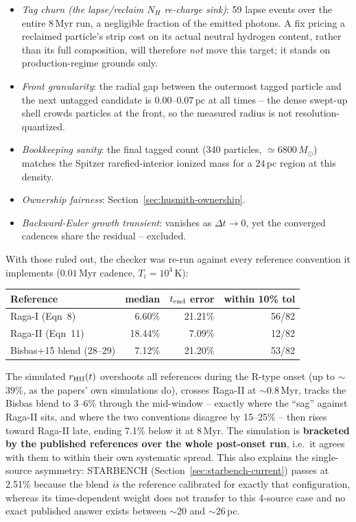 \begin{itemize}
\item \emph{Tag churn (the lapse/reclaim $N_H$ re-charge sink)}: 59
  lapse events over the entire $8\,$Myr run, a negligible fraction of
  the emitted photons. A fix pricing a reclaimed particle's strip cost
  on its actual neutral hydrogen content, rather than its full
  composition, will therefore \emph{not} move this target; it stands on
  production-regime grounds only.
\item \emph{Front granularity}: the radial gap between the outermost
  tagged particle and the next untagged candidate is $0.00$--$0.07\,$pc
  at all times -- the dense swept-up shell crowds particles at the
  front, so the measured radius is not resolution-quantized.
\item \emph{Bookkeeping sanity}: the final tagged count (340 particles,
  $\simeq 6800\,M_\odot$) matches the Spitzer rarefied-interior ionized
  mass for a $24\,$pc region at this density.
\item \emph{Ownership fairness}: Section~\ref{sec:husmith-ownership}.
\item \emph{Backward-Euler growth transient}: vanishes as $\Delta t
  \to 0$, yet the converged cadences share the residual -- excluded.
\end{itemize}

With those ruled out, the checker was re-run against every reference
convention it implements ($0.01\,$Myr cadence, $T_i=10^4\,$K):

\begin{center}
\begin{tabular}{lrrr}
\hline
Reference & median & $t_{\rm end}$ error & within 10\% tol \\
\hline
Raga-I (Eqn~8)          &  6.60\% & 21.21\% & 56/82 \\
Raga-II (Eqn~11)        & 18.44\% &  7.09\% & 12/82 \\
Bisbas+15 blend (28--29) &  7.12\% & 21.20\% & 53/82 \\
\hline
\end{tabular}
\end{center}

The simulated $r_{\rm HII}(t)$ overshoots all references during the
R-type onset (up to $\sim$39\%, as the papers' own simulations do),
crosses Raga-II at $\sim$0.8\,Myr, tracks the Bisbas blend to 3--6\%
through the mid-window -- exactly where the ``sag'' against Raga-II
sits, and where the two conventions disagree by 15--25\% -- then rises
toward Raga-II late, ending 7.1\% below it at $8\,$Myr. The simulation
is \textbf{bracketed by the published references over the whole
post-onset run}, i.e.\ it agrees with them to within their own
systematic spread. This also explains the single-source asymmetry:
STARBENCH (Section~\ref{sec:starbench-current}) passes at 2.51\%
because the blend \emph{is} the reference calibrated for exactly that
configuration, whereas its time-dependent weight does not transfer to
this 4-source case and no exact published answer exists between
$\sim$20 and $\sim$26\,pc.

